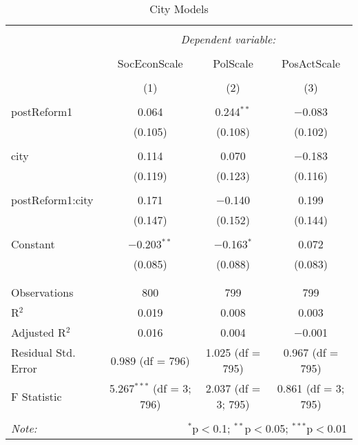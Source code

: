 
\begin{table}[!htbp] \centering 
  \caption{City Models} 
  \label{} 
\begin{tabular}{@{\extracolsep{5pt}}lccc} 
\\[-1.8ex]\hline 
\hline \\[-1.8ex] 
 & \multicolumn{3}{c}{\textit{Dependent variable:}} \\ 
\cline{2-4} 
\\[-1.8ex] & SocEconScale & PolScale & PosActScale \\ 
\\[-1.8ex] & (1) & (2) & (3)\\ 
\hline \\[-1.8ex] 
 postReform1 & 0.064 & 0.244$^{**}$ & $-$0.083 \\ 
  & (0.105) & (0.108) & (0.102) \\ 
  & & & \\ 
 city & 0.114 & 0.070 & $-$0.183 \\ 
  & (0.119) & (0.123) & (0.116) \\ 
  & & & \\ 
 postReform1:city & 0.171 & $-$0.140 & 0.199 \\ 
  & (0.147) & (0.152) & (0.144) \\ 
  & & & \\ 
 Constant & $-$0.203$^{**}$ & $-$0.163$^{*}$ & 0.072 \\ 
  & (0.085) & (0.088) & (0.083) \\ 
  & & & \\ 
\hline \\[-1.8ex] 
Observations & 800 & 799 & 799 \\ 
R$^{2}$ & 0.019 & 0.008 & 0.003 \\ 
Adjusted R$^{2}$ & 0.016 & 0.004 & $-$0.001 \\ 
Residual Std. Error & 0.989 (df = 796) & 1.025 (df = 795) & 0.967 (df = 795) \\ 
F Statistic & 5.267$^{***}$ (df = 3; 796) & 2.037 (df = 3; 795) & 0.861 (df = 3; 795) \\ 
\hline 
\hline \\[-1.8ex] 
\textit{Note:}  & \multicolumn{3}{r}{$^{*}$p$<$0.1; $^{**}$p$<$0.05; $^{***}$p$<$0.01} \\ 
\end{tabular} 
\end{table} 
